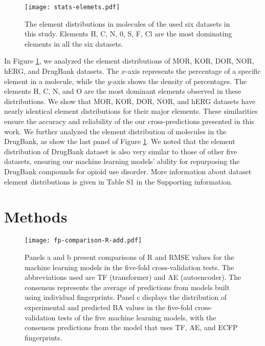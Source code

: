 \documentclass[10pt]{article}
\begin{document}
		
		
			\begin{figure}[ht]
			\centering
			\texttt{[image: stats-elemets.pdf]} 
			\caption{{\footnotesize The element distributions in molecules of the used six datasets in this study. Elements H, C, N, 0, S, F, Cl are the most dominating elements in all the six datasets.} }
			\label{Fig:stats-elemets}
		\end{figure} 
		
In Figure \ref{Fig:stats-elemets}, we analyzed the element distributions of MOR, KOR, DOR, NOR,  hERG, and DrugBank  datasets. 
The $x$-axis represents the percentage of a specific element in a molecule, while the $y$-axis shows the density of percentages. The elements H, C, N, and O are the most dominant elements observed in these distributions.
We show that MOR, KOR, DOR, NOR, and hERG  datasets  have nearly identical element distributions for their major elements.  These similarities ensure the accuracy and reliability of the our cross-predictions presented in this work. We further analyzed the element distribution of molecules in the DrugBank, as show the last panel of Figure \ref{Fig:stats-elemets}. We noted that the element distribution of DrugBank dataset is also very similar to those of other five datasets, ensuring our machine learning models' ability for repurposing the DrugBank compounds for opioid use disorder.  More information about dataset element distributions is given in Table S1 in the Supporting information. 
		
	
	
		
		\section{Methods}
		
		\begin{figure}[ht]
			\centering
			\texttt{[image: fp-comparison-R-add.pdf]} 
			\caption{{\footnotesize Panels a and b present comparisons of R and RMSE values for the machine learning models in the five-fold cross-validation tests. The abbreviations used are TF (transformer) and AE (autoencoder). The consensus represents the average of predictions from models built using individual fingerprints. Panel c displays the distribution of experimental and predicted BA values in the five-fold cross-validation tests of the five machine learning models, with the consensus predictions from the model that uses TF, AE, and ECFP fingerprints.} }
			\label{Fig:fp-comparisons}
		\end{figure} 
		
\end{document}
